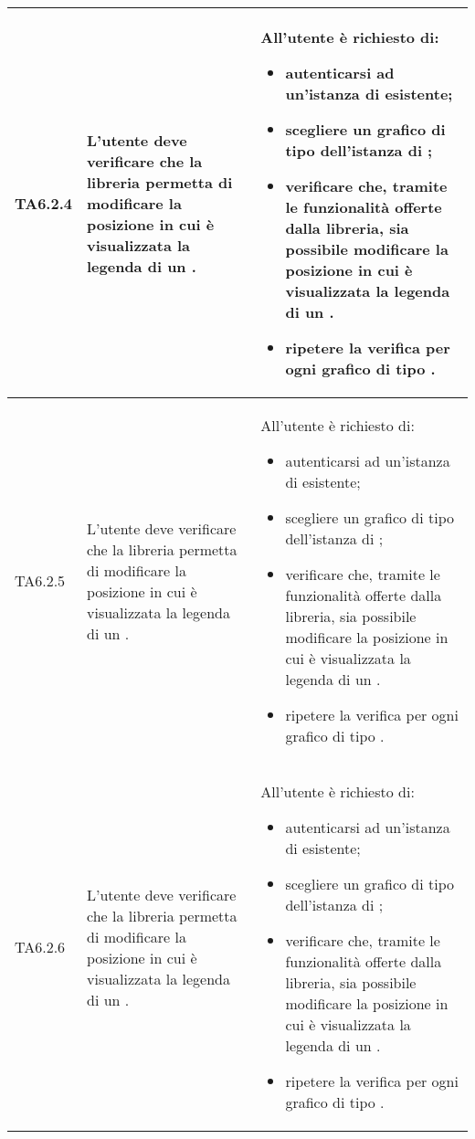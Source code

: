 \begin{longtabu}{| X[0.5] | X | X |}
	TA6.2.4 & L'utente  deve verificare che la libreria permetta di modificare la posizione in cui è visualizzata la legenda di un .
		
		& All'utente  è richiesto di:
		\begin{itemize}
			\item autenticarsi ad un'istanza di \projectname{} esistente;
			\item scegliere un grafico di tipo  dell'istanza di \projectname{};
			\item verificare che, tramite le funzionalità offerte dalla libreria, sia possibile modificare la posizione in cui è visualizzata la legenda di un .
			\item ripetere la verifica per ogni grafico di tipo .
		\end{itemize}
\\ \hline

	TA6.2.5 & L'utente  deve verificare che la libreria permetta di modificare la posizione in cui è visualizzata la legenda di un .
		
		& All'utente  è richiesto di:
		\begin{itemize}
			\item autenticarsi ad un'istanza di \projectname{} esistente;
			\item scegliere un grafico di tipo  dell'istanza di \projectname{};
			\item verificare che, tramite le funzionalità offerte dalla libreria, sia possibile modificare la posizione in cui è visualizzata la legenda di un .
			\item ripetere la verifica per ogni grafico di tipo .
		\end{itemize}
\\ \hline

	TA6.2.6 & L'utente  deve verificare che la libreria permetta di modificare la posizione in cui è visualizzata la legenda di un .
		
		& All'utente  è richiesto di:
		\begin{itemize}
			\item autenticarsi ad un'istanza di \projectname{} esistente;
			\item scegliere un grafico di tipo  dell'istanza di \projectname{};
			\item verificare che, tramite le funzionalità offerte dalla libreria, sia possibile modificare la posizione in cui è visualizzata la legenda di un .
			\item ripetere la verifica per ogni grafico di tipo .
		\end{itemize}
\\ \hline


\end{longtabu}
